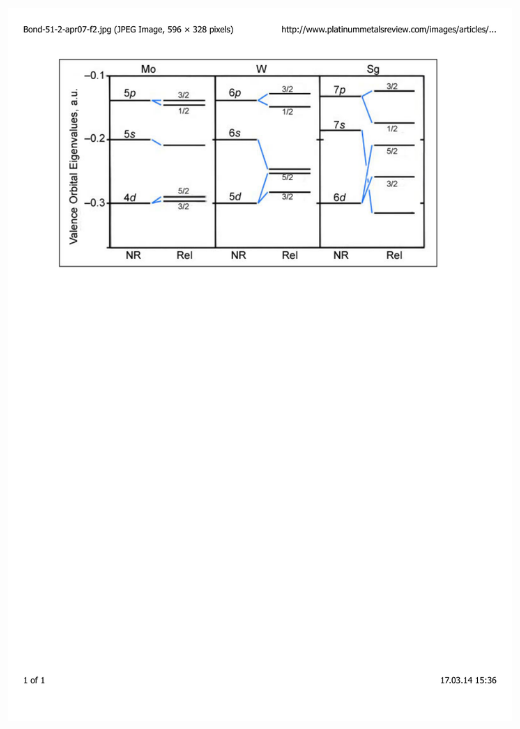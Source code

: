 \documentclass[mathserif,8pt]{beamer}
\begin{document}
\begin{frame}
\begin{columns}
\begin{column}{.55\textwidth}
	\includegraphics[viewport = 0 520 520 800, clip, scale=0.3]{figures/orbital_energies.pdf}
    \end{column}
    \end{columns}
\end{frame}
\end{document}
